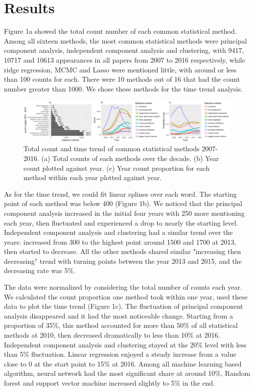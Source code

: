 \documentclass[11pt]{article}
\begin{document}
\section{Results}

Figure 1a showed the total count number of each common statistical method. Among all sixteen methods, the most common statistical methods were principal component analysis, independent component analysis and clustering, with 9417, 10717 and 10613 appearances in all papers from 2007 to 2016 respectively, while ridge regression, MCMC and Lasso were mentioned little, with around or less than 100 counts for each. There were 10 methods out of 16 that had the count number greater than 1000. We chose these methods for the time trend analysis. 

\begin{figure}[!htb]
\centering
\includegraphics[scale=.4]{p1.pdf}
\centering
\caption{Total count and time trend of common statistical methods 2007-2016. (a) Total counts of each methods over the decade. (b) Year count plotted against year. (c) Year count proportion for each method within each year plotted against year.}
\label{fig:digraph}
\end{figure}

As for the time trend, we could fit linear splines over each word. The starting point of each method was below 400 (Figure 1b). We noticed that the principal component analysis increased in the initial four years with 250 more mentioning each year, then fluctuated and experienced a drop to nearly the starting level. Independent component analysis and clustering had a similar trend over the years: increased from 300 to the highest point around 1500 and 1700 at 2013, then started to decrease. All the other methods shared similar "increasing then decreasing" trend with turning points between the year 2013 and 2015, and the decreasing rate was 5\%.

The data were normalized by considering the total number of counts each year. We calculated the count proportion one method took within one year, used these data to plot the time trend (Figure 1c). The fluctuation of principal component analysis disappeared and it had the most noticeable change. Starting from a proportion of 35\%, this method accounted for more than 50\% of all statistical methods at 2010, then decreased dramatically to less than 10\% at 
2016. Independent component analysis and clustering stayed at the 20\% level with less than 5\% fluctuation. Linear regression enjoyed a steady increase from a value close to 0 at the start point to 15\% at 2016. Among all machine learning based algorithm, neural network had the most significant share at around 10\%. Random forest and support vector machine increased slightly to 5\% in the end. 
\end{document}
